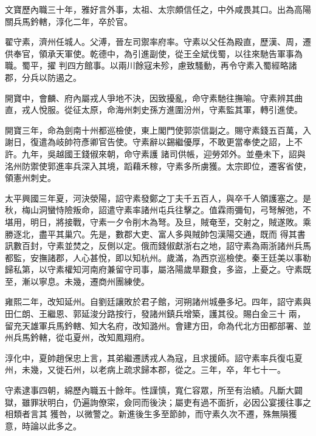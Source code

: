 \begin{pinyinscope}
 文寶歷內職三十年，雅好言外事，太祖、太宗頗信任之，中外咸畏其口。出為高陽關兵馬鈐轄，淳化二年，卒於官。



 翟守素，濟州任城人。父溥，晉左司禦率府率。守素以父任為殿直，歷漢、周，遷供奉官，領承天軍使。乾德中，為引進副使，從王全斌伐蜀，以往來馳告軍事為職。蜀平，擢
 判四方館事。以兩川餘寇未殄，慮致騷動，再令守素入蜀經略諸郡，分兵以防遏之。



 開寶中，會麟、府內屬戎人爭地不決，因致擾亂，命守素馳往撫喻。守素辨其曲直，戎人悅服。從征太原，命海州刺史孫方進圍汾州，守素監其軍，轉引進使。



 開寶三年，命為劍南十州都巡檢使，東上閣門使郭崇信副之。賜守素錢五百萬，入謝日，復遣為岐帥符彥卿官告使。守素辭以錫繼優厚，不敢更當奉使之詔，上不許。九年，吳越國王錢俶來朝，命守素護
 諸司供帳，迎勞郊外。並壘未下，詔與洺州防禦使郭進率兵深入其境，蹈藉禾稼，守素多所虜獲。太宗即位，遷客省使，領憲州刺史。



 太平興國三年夏，河決滎陽，詔守素發鄭之丁夫千五百人，與卒千人領護塞之。是秋，梅山洞蠻恃險叛命，詔遣守素率諸州屯兵往擊之。值霖雨彌旬，弓弩解弛，不堪用，明日，將接戰，守素一夕令削木為弩。及旦，賊奄至，交射之，賊遂敗。乘勝逐北，盡平其巢穴。先是，數郡大吏、富人多與賊帥包漢陽交通，既而
 得其書訊數百封，守素並焚之，反側以定。俄而錢俶獻浙右之地，詔守素為兩浙諸州兵馬都監，安撫諸郡，人心甚悅，即以知杭州。歲滿，為西京巡檢使。秦王廷美以事勒歸私第，以守素權知河南府兼留守司事，屬洛陽歲旱艱食，多盜，上憂之。守素既至，漸以寧息。未幾，遷商州團練使。



 雍熙二年，改知延州。自劉廷讓敗於君子館，河朔諸州城壘多圮。四年，詔守素與田仁朗、王繼恩、郭延浚分路按行，發諸州鎮兵增築，護其役。賜白金三十
 兩，留充天雄軍兵馬鈐轄、知大名府，改知潞州。會建方田，命為代北方田都部署、並州兵馬鈐轄，從屯夏州，改知鳳翔府。



 淳化中，夏帥趙保忠上言，其弟繼遷誘戎人為寇，且求援師。詔守素率兵復屯夏州，未幾，又徙石州，以老病上疏求歸本郡，從之。三年，卒，年七十一。



 守素逮事四朝，綿歷內職五十餘年。性謹慎，寬仁容眾，所至有治績。凡斷大闢獄，雖罪狀明白，仍遍詢僚寀，僉同而後決；屬吏有過不面折，必因公宴援往事之相類者言其
 獲咎，以微警之。新進後生多至節帥，而守素久次不遷，殊無隕獲意，時論以此多之。




\end{pinyinscope}
